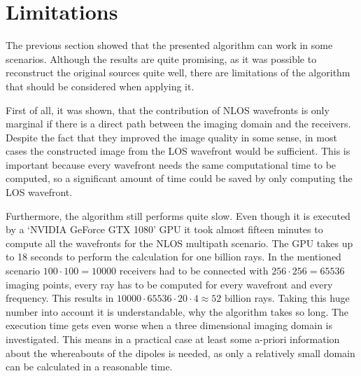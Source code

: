 \section{Limitations}
The previous section showed that the presented algorithm can work in some scenarios.
Although the results are quite promising, as it was possible to reconstruct the original sources quite well, there are limitations of the algorithm that should be considered when applying it.

First of all, it was shown, that the contribution of NLOS wavefronts is only marginal if there is a direct path between the imaging domain and the receivers.
Despite the fact that they improved the image quality in some sense, in most cases the constructed image from the LOS wavefront would be sufficient.
This is important because every wavefront needs the same computational time to be computed, so a significant amount of time could be saved by only computing the LOS wavefront.

Furthermore, the algorithm still performs quite slow.
Even though it is executed by a `NVIDIA GeForce GTX 1080' GPU it took almost fifteen minutes to compute all the wavefronts for the NLOS multipath scenario.
The GPU takes up to 18 seconds to perform the calculation for one billion rays.
In the mentioned scenario \(100 \cdot 100 = 10000\) receivers had to be connected with \(256 \cdot 256 = 65536\) imaging points, every ray has to be computed for every wavefront and every frequency.
This results in \(10000 \cdot 65536 \cdot 20 \cdot 4 \approx 52\) billion rays.
Taking this huge number into account it is understandable, why the algorithm takes so long.
The execution time gets even worse when a three dimensional imaging domain is investigated.
This means in a practical case at least some a-priori information about the whereabouts of the dipoles is needed, as only a relatively small domain can be calculated in a reasonable time.

